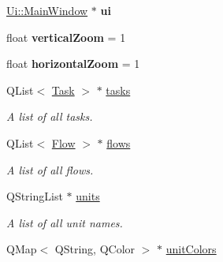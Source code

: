 \begin{DoxyCompactItemize}
\item 
\hypertarget{class_main_window_a35466a70ed47252a0191168126a352a5}{}\hyperlink{class_ui_1_1_main_window}{Ui\+::\+Main\+Window} $\ast$ {\bfseries ui}\label{class_main_window_a35466a70ed47252a0191168126a352a5}

\item 
\hypertarget{class_main_window_abe042bf7fb79319c77c2e2aeea0cd3e6}{}float {\bfseries vertical\+Zoom} = 1\label{class_main_window_abe042bf7fb79319c77c2e2aeea0cd3e6}

\item 
\hypertarget{class_main_window_a75d4db6cf3737249d72aa1cb2859b424}{}float {\bfseries horizontal\+Zoom} = 1\label{class_main_window_a75d4db6cf3737249d72aa1cb2859b424}

\item 
\hypertarget{class_main_window_ab302362b256360d527a628bdbfcde171}{}Q\+List$<$ \hyperlink{struct_task}{Task} $>$ $\ast$ \hyperlink{class_main_window_ab302362b256360d527a628bdbfcde171}{tasks}\label{class_main_window_ab302362b256360d527a628bdbfcde171}

\begin{DoxyCompactList}\small\item\em A list of all tasks. \end{DoxyCompactList}\item 
\hypertarget{class_main_window_a843068e01d54730258357a4bc5f29bac}{}Q\+List$<$ \hyperlink{struct_flow}{Flow} $>$ $\ast$ \hyperlink{class_main_window_a843068e01d54730258357a4bc5f29bac}{flows}\label{class_main_window_a843068e01d54730258357a4bc5f29bac}

\begin{DoxyCompactList}\small\item\em A list of all flows. \end{DoxyCompactList}\item 
\hypertarget{class_main_window_aad7505c53a0ad219080b3c1b1d1ef1e6}{}Q\+String\+List $\ast$ \hyperlink{class_main_window_aad7505c53a0ad219080b3c1b1d1ef1e6}{units}\label{class_main_window_aad7505c53a0ad219080b3c1b1d1ef1e6}

\begin{DoxyCompactList}\small\item\em A list of all unit names. \end{DoxyCompactList}\item 
\hypertarget{class_main_window_a306683291c0136c9808f7026b37820e5}{}Q\+Map$<$ Q\+String, Q\+Color $>$ $\ast$ \hyperlink{class_main_window_a306683291c0136c9808f7026b37820e5}{unit\+Colors}\label{class_main_window_a306683291c0136c9808f7026b37820e5}


\end{DoxyCompactItemize}
